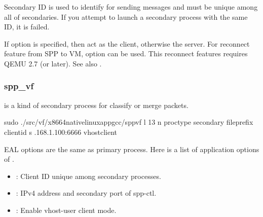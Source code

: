\documentclass[a4paper,11pt,openany,oneside,english]{sphinxmanual}
\begin{document}
Secondary ID is used to identify for sending messages and must be
unique among all of secondaries.
If you attempt to launch a secondary process with the same ID, it
is failed.

If  option is specified, then  act as
the client, otherwise the server.
For reconnect feature from SPP to VM,  option can be
used. This reconnect features requires QEMU 2.7 (or later).
See also .


\subsubsection{spp\_vf}
\label{\detokenize{gsg/howto_use:spp-vf}}
 is a kind of secondary process for classify or merge packets.

\begin{sphinxVerbatim}[commandchars=\\\{\},formatcom=\footnotesize]
 sudo ./src/vf/x86\PYGZus{}64\PYGZhy{}native\PYGZhy{}linuxapp\PYGZhy{}gcc/spp\PYGZus{}vf 
    \PYGZhy{}l \PYGZhy{}13 \PYGZhy{}n  
    \PYGZhy{}\PYGZhy{}proc\PYGZhy{}type secondary 
    \PYGZhy{}\PYGZhy{}file\PYGZhy{}prefix  
    \PYGZhy{}\PYGZhy{} 
    \PYGZhy{}\PYGZhy{}client\PYGZhy{}id  
    \PYGZhy{}s .168.1.100:6666 
    \PYGZhy{}\PYGZhy{}vhost\PYGZhy{}client
\end{sphinxVerbatim}

EAL options are the same as primary process. Here is a list of application
options of .
\begin{itemize}
\item {} 
: Client ID unique among secondary processes.

\item {} 
: IPv4 address and secondary port of spp-ctl.

\item {} 
: Enable vhost-user client mode.

\end{itemize}
\end{document}
